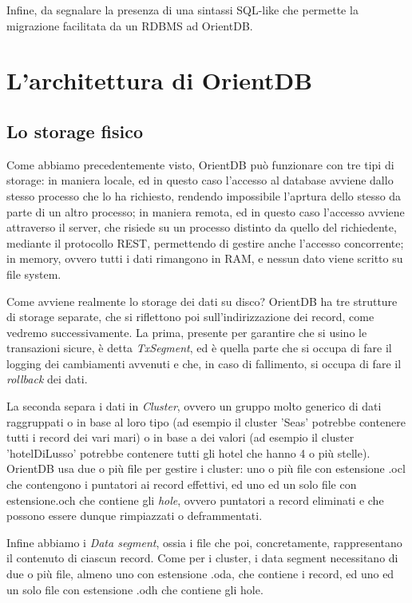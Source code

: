 Infine, da segnalare la presenza di una sintassi SQL-like che permette la migrazione facilitata da un RDBMS ad OrientDB.

\section{L'architettura di OrientDB}
\subsection{Lo storage fisico}
Come abbiamo precedentemente visto, OrientDB può funzionare con tre tipi di storage: in maniera locale, ed in questo caso l'accesso al database avviene dallo stesso processo che lo ha richiesto, rendendo impossibile l'aprtura dello stesso da parte di un altro processo; in maniera remota, ed in questo caso l'accesso avviene attraverso il server, che risiede su un processo distinto da quello del richiedente, mediante il protocollo REST, permettendo di gestire anche l'accesso concorrente; in memory, ovvero tutti i dati rimangono in RAM, e nessun dato viene scritto su file system.

Come avviene realmente lo storage dei dati su disco? OrientDB ha tre strutture di storage separate, che si riflettono poi sull'indirizzazione dei record, come vedremo successivamente. La prima, presente per garantire che si usino le transazioni sicure, è detta \emph{TxSegment}, ed è quella parte che si occupa di fare il logging dei cambiamenti avvenuti e che, in caso di fallimento, si occupa di fare il \emph{rollback} dei dati.

La seconda separa i dati in \emph{Cluster}, ovvero un gruppo molto generico di dati raggruppati o in base al loro tipo (ad esempio il cluster 'Seas' potrebbe contenere tutti i record dei vari mari) o in base a dei valori (ad esempio il cluster 'hotelDiLusso' potrebbe contenere tutti gli hotel che hanno 4 o più stelle). OrientDB usa due o più file per gestire i cluster: uno o più file con estensione .ocl che contengono i puntatori ai record effettivi, ed uno ed un solo file con estensione.och che contiene gli \emph{hole}, ovvero puntatori a record eliminati e che possono essere dunque rimpiazzati o deframmentati.

Infine abbiamo i \emph{Data segment}, ossia i file che poi, concretamente, rappresentano il contenuto di ciascun record. Come per i cluster, i data segment necessitano di due o più file, almeno uno con estensione .oda, che contiene i record, ed uno ed un solo file con estensione .odh che contiene gli hole.

